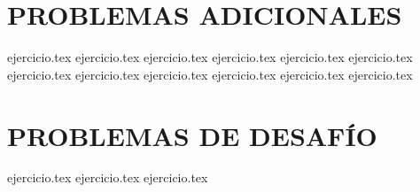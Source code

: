 \section*{PROBLEMAS ADICIONALES}
\begin{enumerate}
    \setcounter{enumi}{43}
    {ejercicio.tex}
    {ejercicio.tex}
    {ejercicio.tex}
    {ejercicio.tex}
    {ejercicio.tex}
    {ejercicio.tex}
    {ejercicio.tex}
    {ejercicio.tex}
    {ejercicio.tex}
    {ejercicio.tex}
    {ejercicio.tex}
    {ejercicio.tex}
\end{enumerate}

\section*{PROBLEMAS DE DESAFÍO}
\begin{enumerate}
    \setcounter{enumi}{55}
    {ejercicio.tex}
    {ejercicio.tex}
    {ejercicio.tex}
\end{enumerate}
